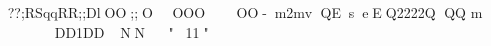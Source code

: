 ??;RSqqRR;;DlOO;;OOOOOO-m2mv	QEseEQ2222Q	QQ	m	\1DD1DDNN"11"%